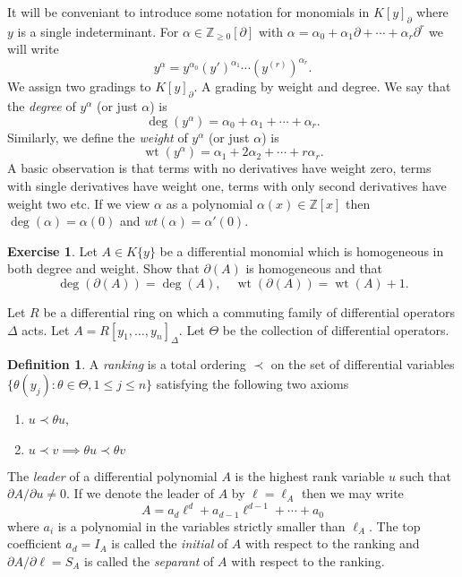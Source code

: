 \documentclass[]{article}
\numberwithin{equation}{section}
\theoremstyle{definition}
\newtheorem{definition}[theorem]{Definition}
\newtheorem{exercise}[theorem]{Exercise}
\theoremstyle{remark}
\newcommand{\ZZ}{\mathbb{Z}}
\newcommand{\wt}{\operatorname{wt}}
\begin{document}
It will be conveniant to introduce some notation for monomials in $K[ y ]_{\partial}$ where $y$ is a single indeterminant. 
For $\alpha \in \ZZ_{\geq 0}[\partial]$ with $\alpha = \alpha_0 + \alpha_1 \partial + \cdots + \alpha_r \partial^r$ we will write 
$$ y^{\alpha} = y^{\alpha_0} (y')^{\alpha_1} \cdots (y^{(r)})^{\alpha_r}.$$
We assign two gradings to $K[y]_{\partial}$. 
A grading by weight and degree. 
We say that the \emph{degree} of $y^{\alpha}$ (or just $\alpha$) is 
$$\deg(y^{\alpha}) = \alpha_0 + \alpha_1 + \cdots + \alpha_r.$$
Similarly, we define the \emph{weight} of $y^{\alpha}$ (or just $\alpha$) is 
$$ \wt(y^{\alpha}) = \alpha_1 + 2\alpha_2 + \cdots + r \alpha_r.$$
A basic observation is that terms with no derivatives have weight zero, terms with single derivatives have weight one, terms with only second derivatives have weight two etc. 
If we view $\alpha$ as a polynomial $\alpha(x) \in \ZZ[x]$ then $\deg(\alpha) = \alpha(0)$ and $wt(\alpha) = \alpha'(0)$. 

\begin{exercise}
Let $A \in K\lbrace y \rbrace$ be a differential monomial which is homogeneous in both degree and weight. Show that $\partial(A)$ is homogeneous and that 
 $$ \deg(\partial(A)) = \deg(A), \quad \wt(\partial(A)) = \wt(A)+1.$$
\end{exercise}

Let $R$ be a differential ring on which a commuting family of differential operators $\Delta$ acts.
Let $A = R[y_1,\ldots,y_n]_{\Delta}$. 
Let $\Theta$ be the collection of differential operators. 
\begin{definition}
	A \emph{ranking} is a total ordering $\prec$ on the set of differential variables
	$ \lbrace \theta(y_j) \colon \theta \in \Theta, 1\leq j \leq n \rbrace $
	satisfying the following two axioms
	\begin{enumerate}
		\item $ u \prec \theta u$, 
		\item $u \prec v \implies \theta u \prec \theta v $
	\end{enumerate}
	
\end{definition}

The \emph{leader} of a differential polynomial $A$ is the highest rank variable $u$ such that $\partial A/\partial u \neq 0$. 
If we denote the leader of $A$ by $\ell=\ell_A$ then we may write 
$$A = a_d \ell^d + a_{d-1} \ell^{d-1} + \cdots + a_0$$ 
where $a_i$ is a polynomial in the variables strictly smaller than $\ell_A$. 
The top coefficient $a_d = I_A$ is called the \emph{initial} of $A$ with respect to the ranking and $\partial A/\partial \ell = S_A$ is called the \emph{separant} of $A$ with respect to the ranking. 
\end{document}

